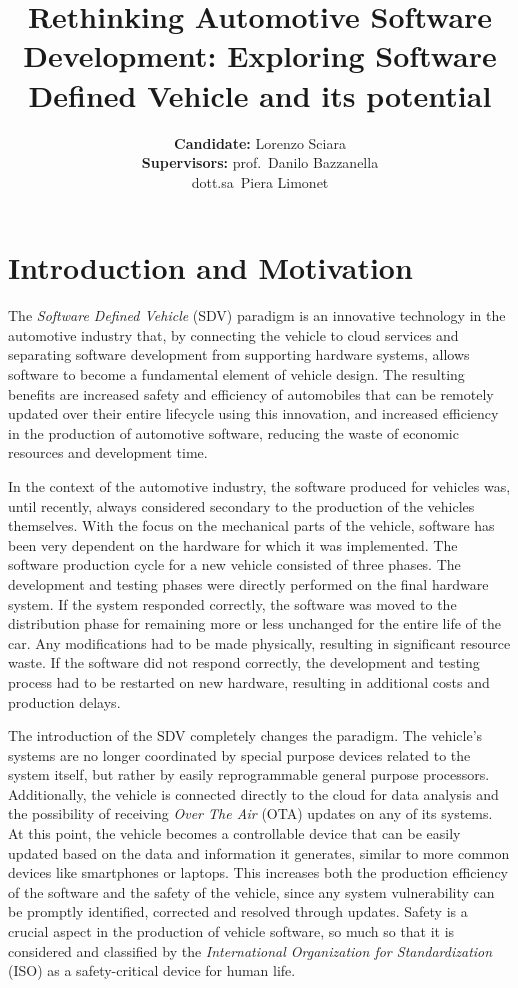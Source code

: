 \documentclass[10pt,a4paper,roman, twocolumn]{article}
\title{\LARGE\textbf{Rethinking Automotive Software Development: Exploring Software Defined Vehicle and its potential}}
\author{
	\textbf{Candidate:} Lorenzo Sciara\\
	\textbf{Supervisors:} prof.~Danilo Bazzanella \\ dott.sa~Piera Limonet
}
\date{}
\begin{document}
\setlength{\belowdisplayskip}{0pt} \setlength{\belowdisplayshortskip}{0pt}
\setlength{\abovedisplayskip}{-0.5\baselineskip} \setlength{\abovedisplayshortskip}{-0.5\baselineskip}

	
\maketitle
		
\section{Introduction and Motivation}
The \textit{Software Defined Vehicle} (SDV) paradigm is an innovative technology in the automotive industry that, by connecting the vehicle to cloud services and separating software development from supporting hardware systems, allows software to become a fundamental element of vehicle design. The resulting benefits are increased safety and efficiency of automobiles that can be remotely updated over their entire lifecycle using this innovation, and increased efficiency in the production of automotive software, reducing the waste of economic resources and development time.

In the context of the automotive industry, the software produced for vehicles was, until recently, always considered secondary to the production of the vehicles themselves. With the focus on the mechanical parts of the vehicle, software has been very dependent on the hardware for which it was implemented. The software production cycle for a new vehicle consisted of three phases. The development and testing phases were directly performed on the final hardware system. If the system responded correctly, the software was moved to the distribution phase for remaining more or less unchanged for the entire life of the car. Any modifications had to be made physically, resulting in significant resource waste. If the software did not respond correctly, the development and testing process had to be restarted on new hardware, resulting in additional costs and production delays.

The introduction of the SDV completely changes the paradigm. The vehicle's systems are no longer coordinated by special purpose devices related to the system itself, but rather by easily reprogrammable general purpose processors. Additionally, the vehicle is connected directly to the cloud for data analysis and the possibility of receiving \textit{Over The Air} (OTA) updates on any of its systems. At this point, the vehicle becomes a controllable device that can be easily updated based on the data and information it generates, similar to more common devices like smartphones or laptops. This increases both the production efficiency of the software and the safety of the vehicle, since any system vulnerability can be promptly identified, corrected and resolved through updates. Safety is a crucial aspect in the production of vehicle software, so much so that it is considered and classified by the \textit{International Organization for Standardization} (ISO) as a safety-critical device for human life.
\end{document}
